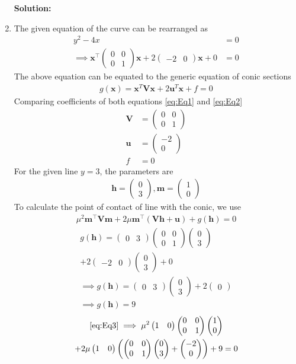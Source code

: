 \documentclass[12pt]{article}
\providecommand{\brak}[1]{\ensuremath{\left(#1\right)}}
\newcommand{\solution}{\noindent \textbf{Solution: }}
\newcommand{\myvec}[1]{\ensuremath{\begin{pmatrix}#1\end{pmatrix}}}
\let\vec\mathbf
\begin{document}
\begin{enumerate}
\solution 
\item The given equation of the curve can be rearranged as
\begin{align}
	y^2-4x &= 0 \\
        \label{eq:Eq1}
	\implies \vec{x}^\top\myvec{0 & 0 \\ 0 & 1}\vec{x} + 2\myvec{-2 & 0}\vec{x}+0 &= 0 
\end{align}
The above equation can be equated to the generic equation of conic sections
\begin{align}
	\label{eq:Eq2}
	g\brak{\vec{x}} = \vec{x}^T\vec{V}\vec{x} + 2\vec{u}^T\vec{x} + f = 0 
\end{align}
Comparing coefficients of both equations \eqref{eq:Eq1} and \eqref{eq:Eq2} 
\begin{align}
	\vec{V} &= \myvec{ 0 & 0 \\ 0 & 1} \\
	\vec{u} &= \myvec{-2 \\ 0} \\
	f &= 0
\end{align}
For the given line $y=3$, the parameters are
\begin{align}
	\vec{h} = \myvec{0 \\ 3} , \vec{m} = \myvec{1 \\ 0 }
\end{align}
To calculate the point of contact of line with the conic, we use
\begin{align}
	\label{eq:Eq3}
	\mu^2\vec{m}^\top\vec{V}\vec{m}+2\mu\vec{m}^\top\brak{\vec{V}\vec{h}+\vec{u}}+g\brak{\vec{h}}= 0 
\end{align}
\begin{multline}
	g\brak{\vec{h}}=\myvec{0 & 3}\myvec{0 & 0 \\ 0 & 1}\myvec{0 \\3} \\
	+ 2\myvec{-2 & 0}\myvec{0 \\ 3} + 0 \\
	 \implies g\brak{\vec{h}} = \myvec{0 & 3}\myvec{0 \\3} + 2\myvec{0} \\ 
	 \implies g\brak{\vec{h}} = 9 
\end{multline}
\begin{multline}
	\eqref{eq:Eq3} \implies \mu^2\myvec{1 & 0}\myvec{0 & 0 \\ 0 & 1}\myvec{1 \\ 0} \\
	 + 2\mu\myvec{1 & 0}\brak{\myvec{0 & 0 \\ 0 & 1}\myvec{0 \\3}+\myvec{-2 \\ 0}} + 9 = 0 \\

\end{multline}
\end{enumerate}
\end{document}
